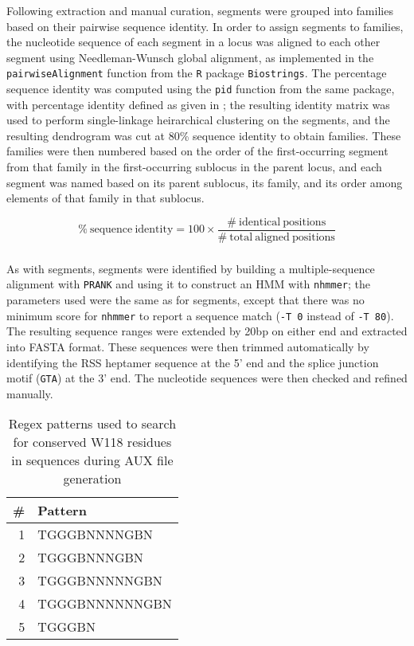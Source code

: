 Following extraction and manual curation, \vh segments were grouped into families based on their pairwise sequence identity. In order to assign segments to families, the nucleotide sequence of each \vh segment in a locus was aligned to each other segment using Needleman-Wunsch global alignment, as implemented in the \lstinline{pairwiseAlignment} function from the \lstinline{R} package \lstinline{Biostrings}. The percentage sequence identity was computed using the \lstinline{pid} function from the same package, with percentage identity defined as given in ; the resulting identity matrix was used to perform single-linkage heirarchical clustering on the \vh segments, and the resulting dendrogram was cut at 80\% sequence identity to obtain \vh families. These families were then numbered based on the order of the first-occurring \vh segment from that family in the first-occurring sublocus in the parent locus, and each \vh segment was named based on its parent sublocus, its family, and its order among elements of that family in that sublocus. %

\begin{equation}
\mathrm{\%~sequence~identity} = 100 \times \frac{\mathrm{\#~identical~positions}}{\mathrm{\#~total~aligned~positions}}
\label{eq:pid}
\end{equation}

\subsubsection{\jh}

As with \vh segments, \jh segments were identified by building a multiple-sequence alignment with \texttt{PRANK} and using it to construct an HMM with \lstinline{nhmmer}; the parameters used were the same as for \vh segments, except that there was no minimum score for \lstinline{nhmmer} to report a sequence match (\lstinline{-T 0} instead of \lstinline{-T 80}). The resulting sequence ranges were extended by 20bp on either end and extracted into FASTA format. These sequences were then trimmed automatically by identifying the RSS heptamer sequence at the 5' end and the splice junction motif (\texttt{GTA}) at the 3' end. The \jh nucleotide sequences were then checked and refined manually.

\begin{wraptable}{r}{5.5cm}
\caption{Regex patterns used to search for conserved W118 residues in \jh sequences during AUX file generation}\label{tab:jh-aux-patterns}
\begin{tabular}{r>{\ttseries}l}\toprule  
\# & Pattern \\\midrule
1 & TGGGBNNNNGBN\\
2 & TGGGBNNNGBN\\
3 & TGGGBNNNNNGBN\\
4 & TGGGBNNNNNNGBN\\
5 & TGGGBN\\\bottomrule
\end{tabular}
\end{wraptable}

